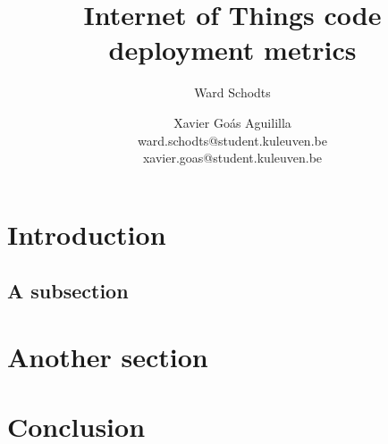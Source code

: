 \documentclass{article}
\title{Internet of Things code deployment metrics}
\author{Ward Schodts \and Xavier Go\'as Aguililla \\ ward.schodts@student.kuleuven.be \\ xavier.goas@student.kuleuven.be}
\begin{document}
\maketitle

\begin{abstract}
  \lipsum[1]
\end{abstract}

\section{Introduction}

  \lipsum[2]

\subsection{A subsection}

  \lipsum[3]

\section{Another section}

  \lipsum[4]

\section{Conclusion}
 \lipsum[5]



\end{document}
